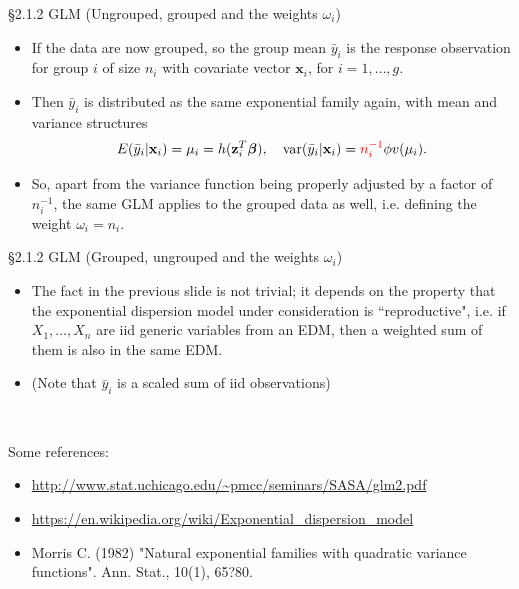 \documentclass{beamer}
\newenvironment{wideitemize}%
  {\begin{itemize}%
    \setlength{\parskip}{1em}}%
  {\end{itemize}}
\begin{document}
\begin{frame}{\S2.1.2 GLM (Ungrouped, grouped and the weights $\omega_i$)}
\begin{wideitemize}

\item
If the data are now grouped, so the group mean $\bar{y}_i$ is  the response observation for group $i$ of
size $n_i$ with covariate vector $\textbf{x}_i$, for $i = 1, \dots, g$.  

\item Then $\bar{y}_i$ is distributed as the same exponential family again, with mean and variance structures
\[
E(\bar{y}_i|\textbf{x}_i)=\mu_i=h(\textbf{z}_i^T\mbox{\boldmath $\beta$}), \quad
\mbox{var}(\bar{y}_i|\textbf{x}_i)=\textcolor{red}{n_i^{-1}}\phi v(\mu_i).
\]


\item So, apart from the variance function being properly adjusted 
by a factor of $n_i^{-1}$, the same GLM applies to the grouped data as well, i.e. defining the weight $\omega_i=n_i$.

\end{wideitemize}

\end{frame}


\begin{frame}{\S2.1.2 GLM (Grouped, ungrouped and the weights $\omega_i$)}

\begin{itemize}




\item The fact in the previous slide is not trivial; it depends on the property that the exponential dispersion model under consideration is ``reproductive", i.e. if $X_1, \dots, X_n$ are iid generic variables from an EDM, then a weighted sum of them  is also in the same EDM. 

\item  (Note that $\bar{y}_i$ is a scaled sum of iid observations)



\end{itemize}
\ \

Some references:
\begin{itemize}
\item
\url{http://www.stat.uchicago.edu/~pmcc/seminars/SASA/glm2.pdf}

\item \url{https://en.wikipedia.org/wiki/Exponential_dispersion_model}
\item Morris C. (1982) "Natural exponential families with quadratic variance functions". Ann. Stat., 10(1), 65?80.
\end{itemize}

\end{frame}
\end{document}

